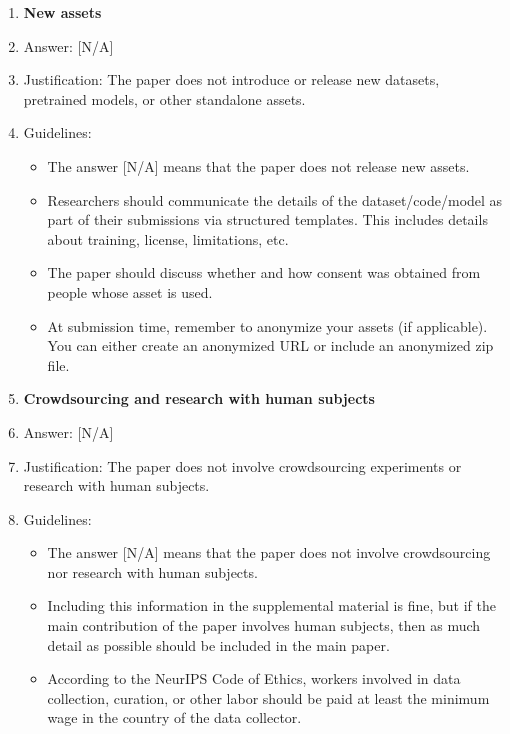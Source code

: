 \documentclass{llmxive}
\providecommand{\answerNA}[1][]{[N/A]#1}
\begin{document}
\begin{enumerate}
\item {\bf New assets}
    \item[] Answer: \answerNA{}
    \item[] Justification: The paper does not introduce or release new datasets, pretrained models, or other standalone assets.
    \item[] Guidelines:
    \begin{itemize}
        \item The answer \answerNA{} means that the paper does not release new assets.
        \item Researchers should communicate the details of the dataset\slash code\slash model as part of their submissions via structured templates. This includes details about training, license, limitations, etc. 
        \item The paper should discuss whether and how consent was obtained from people whose asset is used.
        \item At submission time, remember to anonymize your assets (if applicable). You can either create an anonymized URL or include an anonymized zip file.
    \end{itemize}

\item {\bf Crowdsourcing and research with human subjects}
    \item[] Answer: \answerNA{}
    \item[] Justification: The paper does not involve crowdsourcing experiments or research with human subjects.
    \item[] Guidelines:
    \begin{itemize}
        \item The answer \answerNA{} means that the paper does not involve crowdsourcing nor research with human subjects.
        \item Including this information in the supplemental material is fine, but if the main contribution of the paper involves human subjects, then as much detail as possible should be included in the main paper. 
        \item According to the NeurIPS Code of Ethics, workers involved in data collection, curation, or other labor should be paid at least the minimum wage in the country of the data collector. 
    \end{itemize}


\end{enumerate}
\end{document}
